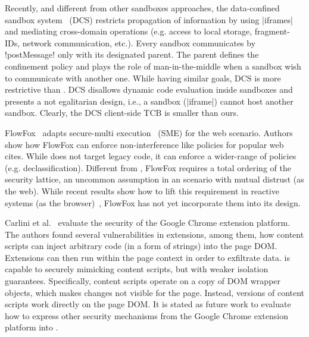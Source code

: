 Recently, and different from other sandboxes approaches, the
data-confined sandbox system~\cite{Akhawe2013} (DCS) restricts
propagation of information by using \js|iframes| and mediating
cross-domain operations (e.g. access to local storage, fragment-IDs,
network communication, etc.).  Every sandbox communicates by
\js!postMessage! only with its designated parent. The parent defines
the confinement policy and plays the role of man-in-the-middle when a
sandbox wish to communicate with another one. While having similar
goals, DCS is more restrictive than \sys. DCS disallows dynamic code
evaluation inside sandboxes and presents a not egalitarian design,
i.e., a sandbox (\js|iframe|) cannot host another sandbox. Clearly,
the DCS client-side TCB is smaller than ours.

FlowFox~\cite{DeGroef:2012} adapts secure-multi execution~\cite{Devriese:2010}
(SME) for the web scenario. Authors show how FlowFox can enforce
non-interference like policies for popular web cites. While \sys{} does not
target legacy code, it can enforce a wider-range of policies
(e.g. declassification). Different from \sys{}, FlowFox requires a total
ordering of the security lattice, an uncommon assumption in an scenario with
mutual distrust (as the web). While recent results show how to lift this
requirement in reactive systems (as the browser)~\cite{ZanariniJR13}, FlowFox
has not yet incorporate them into its design.




Carlini et al.~\cite{Carlini:2012} evaluate the security of the Google Chrome
extension platform. The authors found several vulnerabilities in extensions, among them,
how content scripts can inject arbitrary code (in a form of strings) into the
page DOM. Extensions can then run within the page context in order
to exfiltrate data. \sys{} is capable to securely mimicking content scripts, but
with  weaker isolation guarantees.  Specifically, content scripts operate on a
copy of DOM wrapper objects, which makes changes not visible for the
page. Instead, \sys{} versions of content scripts work directly on the page DOM.
It is stated as future work to evaluate how to express other 
security mechanisms from the Google Chrome extension platform into \sys{}. 

 
 

